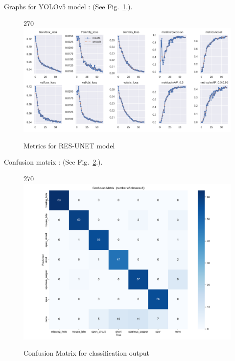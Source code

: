 \documentclass[12pt]{article}
\begin{document}
Graphs for YOLOv5 model : (See Fig.~\ref{fig:graphs_yolo}.).
\begin{figure}[p]
    \centering
    \begin{turn}{270}
    \includegraphics[width=1\paperwidth,height=1\paperheight,keepaspectratio]{./graphics/graphs_yolo.png}
    \end{turn}
    \caption{Metrics for RES-UNET model}
    \label{fig:graphs_yolo}
\end{figure}
\restoregeometry

\clearpage

Confusion matrix : (See Fig.~\ref{fig:confusion_yolo}.).
\begin{figure}[H]
    \centering
    \begin{turn}{270}
    \includegraphics[width=0.7\paperwidth,height=0.7\paperheight,keepaspectratio]{./graphics/confusion_matrix_yolo.png}
    \end{turn}
    \caption{Confusion Matrix for classification output}
    \label{fig:confusion_yolo}
\end{figure}
\end{document}
